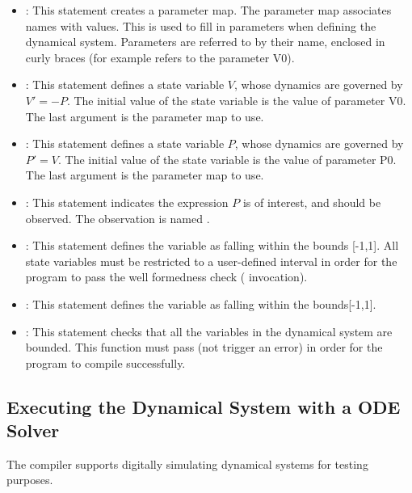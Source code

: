 \begin{itemize}
   \item{}: This statement creates a parameter map. The
     parameter map associates names with values. This is used to fill in
     parameters when defining the dynamical system. Parameters are referred to
     by their name, enclosed in curly braces (for example  refers to
     the parameter V0). 
   \item{}: This statement defines a
     state variable $V$, whose dynamics are governed by $V' = -P$. The initial
     value of the state variable is the value of parameter V0. The last argument
     is the parameter map to use.
   \item{}: This statement defines a
     state variable $P$, whose dynamics are governed by $P' = V$. The initial
     value of the state variable is the value of parameter P0. The last argument
     is the parameter map to use. 

   \item{}: This statement indicates the expression
     $P$ is of interest, and should be observed. The observation is named
     .
   \item{}: This statement defines the variable
      as falling within the bounds [-1,1]. All state variables must be
       restricted to a user-defined interval in order for the program to pass
       the well formedness check ( invocation).
   \item{}: This statement defines the variable
      as falling within the bounds[-1,1].
   \item{}: This statement checks that all the variables in the
     dynamical system are bounded. This function must pass (not trigger an error) in
     order for the program to compile successfully.
\end{itemize}



\subsection{Executing the  Dynamical System with a ODE Solver}

The \legno compiler supports digitally simulating dynamical systems for testing
purposes.

